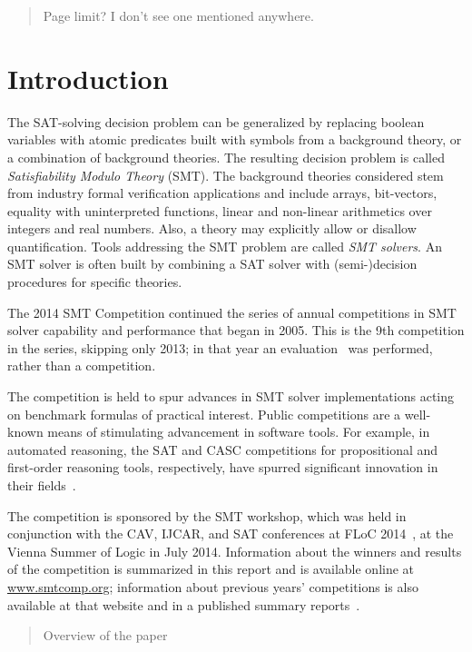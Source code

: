 \documentclass[twosize,11pt]{article}
\newcommand{\comment}[2]{\begin{quote}\sc #1\marginpar{\textcolor{red}{$\ast^{\mbox{#2}}$}}\end{quote}}
\newcommand{\tjark}[1]{\comment{#1}{TW}}
\newcommand{\davidd}[1]{\comment{#1}{DD}}
\newcommand{\davidc}[1]{\comment{#1}{DC}}
\begin{document}
\davidc{Page limit? I don't see one mentioned anywhere.}
	
	
\section{Introduction}
\label{sec:intro}

The SAT-solving decision problem can be generalized by replacing
boolean variables with atomic predicates built with symbols from a
background theory, or a combination of background theories. The
resulting decision problem is called \emph{Satisfiability Modulo
  Theory\/} (SMT). The background theories considered stem from
industry formal verification applications and include arrays,
bit-vectors, equality with uninterpreted functions, linear and
non-linear arithmetics over integers and real numbers. Also, a theory
may explicitly allow or disallow quantification. Tools addressing the
SMT problem are called \emph{SMT solvers\/}. An SMT solver is often
built by combining a SAT solver with (semi-)decision procedures for
specific theories.

The 2014 SMT Competition continued the series of annual competitions in SMT solver capability and performance that began in 2005. This is the 9th competition in the series, skipping only 2013; in that year an evaluation~\cite{it:2014-017} was performed, rather than a competition.

The competition is held to spur advances in
SMT solver implementations acting on benchmark formulas of practical interest. Public competitions are
a well-known means of stimulating advancement in software tools. For example, in automated
reasoning, the SAT and CASC competitions for propositional and first-order reasoning tools, respectively,
have spurred significant innovation in their fields~\cite{leberre+03,PSS02}.

The competition is sponsored by the SMT workshop, which was held in conjunction with the
CAV, IJCAR, and SAT conferences at FLoC 2014~\cite{FLoC2014}, at the Vienna Summer of Logic\cite{VSL} in July 2014.
Information about the winners
and results of the competition is summarized in this report and is available online at \url{www.smtcomp.org}; information
about previous years' competitions is also available at that website and in a published summary reports~\cite{springerlink:10.1007/s10817-012-9246-5,DBLP:conf/cade/CokGBD12,it:2014-017}.%

\davidd{Overview of the paper}
\end{document}
